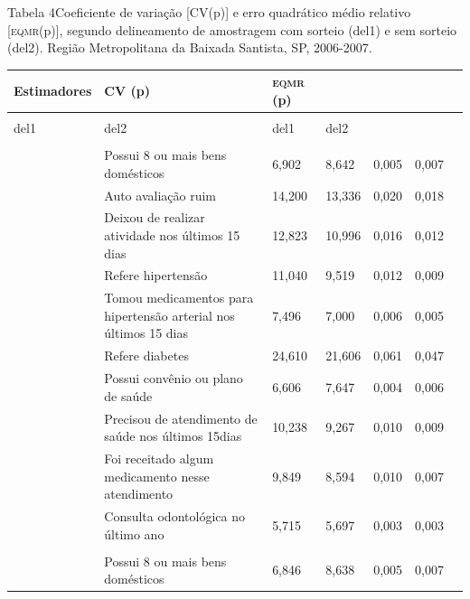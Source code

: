 \documentclass{article}
\begin{document}
Tabela 4Coeficiente de variação [CV(p)] e erro quadrático médio relativo
[\textsc{eqmr}(p)], segundo delineamento de amostragem com sorteio (del1) e sem sorteio
(del2). Região Metropolitana da Baixada Santista, SP, 2006-2007.
\begin{table}
\begin{xtabular}{ l | l | l l | l | l | l }
\hline
Estimadores & CV (p) & \textsc{eqmr} (p)\\ \hline
\\ \hline
del1 & del2 & del1 & del2\\ \hline
{}
&
&
&
\\ \hline

& Possui 8 ou mais bens domésticos
& 6,902
& 8,642
& 0,005
& 0,007
\\ \hline

& Auto avaliação ruim
& 14,200
& 13,336
& 0,020
& 0,018
\\ \hline

& Deixou de realizar atividade nos últimos 15 dias
& 12,823
& 10,996
& 0,016
& 0,012
\\ \hline

& Refere hipertensão
& 11,040
& 9,519
& 0,012
& 0,009
\\ \hline

& Tomou medicamentos para hipertensão arterial nos últimos 15 dias
& 7,496
& 7,000
& 0,006
& 0,005
\\ \hline

& Refere diabetes
& 24,610
& 21,606
& 0,061
& 0,047
\\ \hline

& Possui convênio ou plano de saúde
& 6,606
& 7,647
& 0,004
& 0,006
\\ \hline

& Precisou de atendimento de saúde nos últimos 15dias
& 10,238
& 9,267
& 0,010
& 0,009
\\ \hline

& Foi receitado algum medicamento nesse atendimento
& 9,849
& 8,594
& 0,010
& 0,007
\\ \hline

& Consulta odontológica no último ano
& 5,715
& 5,697
& 0,003
& 0,003
\\ \hline

&
&
&
\\ \hline

& Possui 8 ou mais bens domésticos
& 6,846
& 8,638
& 0,005
& 0,007
\\ \hline


\end{xtabular}
\end{table}
\end{document}
